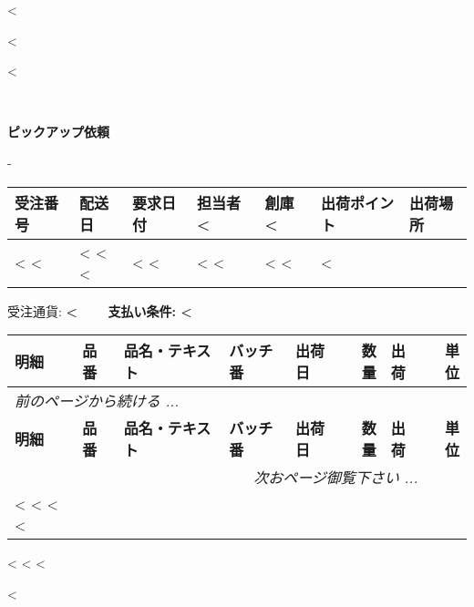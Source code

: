 <%

\begin{CJK}{UTF8}{arialuni}

\vspace*{-3.3cm}
<%
\vspace*{1.0cm}

<%

\hfill \\

\vspace{1.2cm}

\centerline{\textbf{ピックアップ依頼}}
\normalsize

\vspace{0.5cm}
-
\vspace{0.2cm}

\begin{tabularx}{\textwidth}{*{7}{|X}|} \hline
  \textbf{受注番号} & \textbf{配送日} & \textbf{要求日付} & \textbf{担当者}
  <%
  & \textbf{創庫}
  <%
  & \textbf{出荷ポイント} & \textbf{出荷場所} \\ [0.5em]
  \hline
  
  <%
  <%
  & <%
  <%
  <%
  & <%
  <%
  & <%
  <%
  & <%
  <%
  & <%
  \hline
\end{tabularx}
  
\vspace{0.5cm}
	受注通貨: \textbf{<%
　　支払い条件: <%
}
\vspace{0.5cm}
 
\begin{longtable}{|ll p{4.5cm} @{\extracolsep\fill} llrlr|} \hline
  \textbf{明細} & \textbf{品番} & \textbf{品名・テキスト} & \textbf{バッチ番} &
        \textbf{出荷日} & \textbf{数量} & \textbf{出荷}  & \textbf{単位} \\
  \hline
\endfirsthead
  \multicolumn{7}{l}{\emph{前のページから続ける ...}} \\
  \hline
  \textbf{明細} & \textbf{品番} & \textbf{品名・テキスト} & \textbf{バッチ番} &
        \textbf{出荷日} & \textbf{数量} & \textbf{出荷}  & \textbf{単位} \\
  \hline
\endhead
   \hline \multicolumn{7}{r}{\emph{次おページ御覧下さい ...}} \\
\endfoot
  \hline
\endlastfoot
<%
  <%
  <%
<%
\end{longtable}

\parbox{\textwidth}{
\vspace{0.5cm}
<%
  <%
<%
}

\vfill
<%
\end{CJK}

